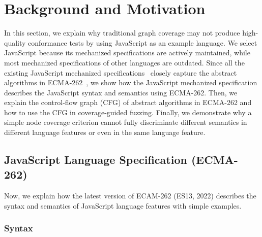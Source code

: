 \section{Background and Motivation}\label{sec:motivation}

In this section, we explain why traditional graph coverage may not
produce high-quality conformance tests by using JavaScript
as an example language. We select JavaScript because its
mechanized specifications are actively maintained,
while most mechanized specifications of other languages are outdated.
Since all the existing JavaScript mechanized specifications~\cite{kjs, javert, jiset,
skel-js} closely capture the abstract algorithms in ECMA-262~\cite{es13},
we show how the JavaScript mechanized specification 
describes the JavaScript syntax and semantics using ECMA-262.
Then, we explain the control-flow graph (CFG) of abstract algorithms in ECMA-262
and how to use the CFG in coverage-guided fuzzing.
Finally, we demonstrate why a simple node coverage criterion cannot fully
discriminate different semantics in different language features or even in the
same language feature.


\subsection{JavaScript Language Specification (ECMA-262)}\label{sec:ecma-262}

Now, we explain how the latest version of ECAM-262 (ES13, 2022) describes
the syntax and semantics of JavaScript language features with simple examples.


\subsubsection{Syntax}\label{sec:syntax}

